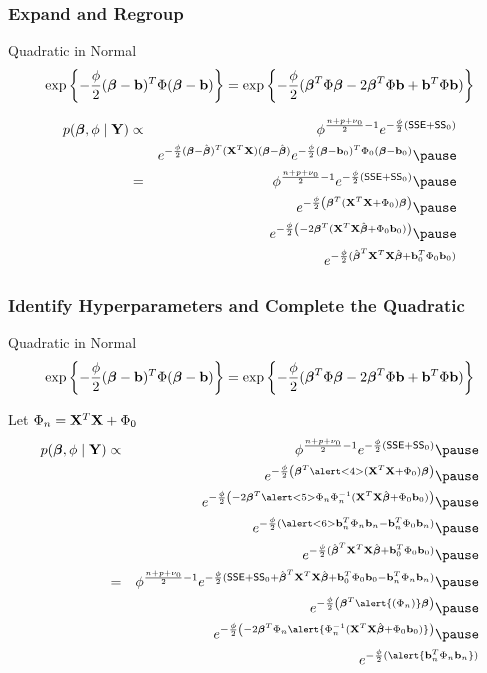 \documentclass[handout]{beamer}\usepackage[]{graphicx}\usepackage[]{color}
\begin{document}
\begin{frame}  \frametitle{ Expand and Regroup}
  Quadratic in Normal
$$\exp\left\{- \frac{\phi}{2} (\boldsymbol{\beta} - \mathbf{b})^T \Phi (\boldsymbol{\beta} - \mathbf{b}) \right\} = \exp\left\{-
  \frac{\phi}{2} (\boldsymbol{\beta}^T \Phi \boldsymbol{\beta} - 2 \boldsymbol{\beta}^T \Phi \mathbf{b} + \mathbf{b}^T\Phi \mathbf{b} )\right\}$$
\pause

\begin{eqnarray*}
 p(\b, \phi \mid \Y) &\propto&  \phi^{\frac {n + p + \nu_0}{ 2} - 1}
 e^{- \frac \phi 2 ( \SSE + \SS_0) }  \\
 & & e^{-\frac{\phi}{2} (\b - \bhat)^T(\X^T\X) (\b - \bhat)}
 e^{- \frac{\phi}{2} (\b - \bv_0)^T \Phi_0 (\b - \bv_0) } \pause  \\
 & = & \phi^{\frac {n + p + \nu_0}{ 2} - 1}
 e^{- \frac \phi 2 ( \SSE + \SS_0) } \pause \\
& &  e^{ -\frac{\phi}{2} \left(  \b^T (\X^T\X + \Phi_0) \b  \right) } \pause \\
& &  e^{  -\frac{\phi}{2} \left( -2 \b^T (\X^T\X \bhat  + \Phi_0 \bv_0)
   \right)} \pause \\
& &  e^{  -\frac{\phi}{2} (\bhat^T \X^T\X \bhat + \bv_0^T \Phi_0 \bv_0
  )}
\end{eqnarray*}


\end{frame}

\begin{frame} \frametitle{ Identify Hyperparameters and Complete the Quadratic}
  Quadratic in Normal
$$\exp\left\{- \frac{\phi}{2} (\boldsymbol{\beta} - \mathbf{b})^T \Phi (\boldsymbol{\beta} - \mathbf{b}) \right\} = \exp\left\{-
  \frac{\phi}{2} (\boldsymbol{\beta}^T \Phi \boldsymbol{\beta} - 2 \boldsymbol{\beta}^T \Phi \mathbf{b} + \mathbf{b}^T\Phi \mathbf{b} )\right\}$$
\pause


Let $\Phi_n = \mathbf{X}^T\mathbf{X} + \Phi_0$ \pause
  \begin{eqnarray*}
 p(\b, \phi \mid \Y) &\propto&  \phi^{\frac {n + p + \nu_0}{ 2} - 1}
 e^{- \frac \phi 2 ( \SSE + \SS_0) } \pause \\
& &  e^{ -\frac{\phi}{2} \left(  \b^T \alert<4>{(\X^T\X + \Phi_0)} \b
  \right) } \pause\\
& &  e^{  -\frac{\phi}{2} \left( -2 \b^T \alert<5>{\Phi_n \Phi_n^{-1}} (\X^T\X \bhat  + \Phi_0 \bv_0)
   \right)} \pause\\
& &  e^{ -\frac{\phi}{2} (\alert<6>{\bv_ n^T \Phi_n \bv_n - \bv_n^T \Phi_0
  \bv_n}) } \pause \\
& &  e^{  -\frac{\phi}{2} (\bhat^T \X^T\X \bhat + \bv_0^T \Phi_0 \bv_0
  )} \pause \\
& = &
  \phi^{\frac {n + p+  \nu_0}{ 2} - 1}
 e^{- \frac \phi 2 ( \SSE + \SS_0  + \bhat^T \X^T\X \bhat + \bv_0^T \Phi_0 \bv_0
 - \bv_n^T \Phi_n \bv_n)}  \pause  \\
& &  e^{ -\frac{\phi}{2} \left(  \b^T \alert{(\Phi_n)} \b
  \right) } \pause\\
& &  e^{  -\frac{\phi}{2} \left( -2 \b^T \Phi_n\alert{\Phi_n^{-1} (\X^T\X \bhat  + \Phi_0 \bv_0)}
   \right)} \pause\\
& &  e^{ -\frac{\phi}{2} (\alert{\bv_ n^T \Phi_n \bv_n}) }
  \end{eqnarray*}

\end{frame}
\end{document}
